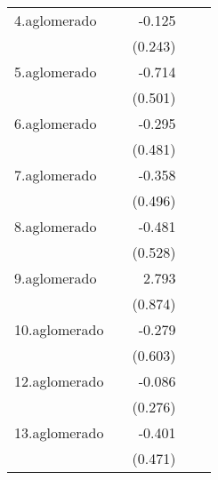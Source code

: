 {\begin{longtable}{l*{4}{D{.}{.}{-1}}}
\addlinespace
4.aglomerado&                     &      -0.125         &                     &                     \\
            &                     &     (0.243)         &                     &                     \\
\addlinespace
5.aglomerado&                     &      -0.714         &                     &                     \\
            &                     &     (0.501)         &                     &                     \\
\addlinespace
6.aglomerado&                     &      -0.295         &                     &                     \\
            &                     &     (0.481)         &                     &                     \\
\addlinespace
7.aglomerado&                     &      -0.358         &                     &                     \\
            &                     &     (0.496)         &                     &                     \\
\addlinespace
8.aglomerado&                     &      -0.481         &                     &                     \\
            &                     &     (0.528)         &                     &                     \\
\addlinespace
9.aglomerado&                     &       2.793\sym{**} &                     &                     \\
            &                     &     (0.874)         &                     &                     \\
\addlinespace
10.aglomerado&                     &      -0.279         &                     &                     \\
            &                     &     (0.603)         &                     &                     \\
\addlinespace
12.aglomerado&                     &      -0.086         &                     &                     \\
            &                     &     (0.276)         &                     &                     \\
\addlinespace
13.aglomerado&                     &      -0.401         &                     &                     \\
            &                     &     (0.471)         &                     &                     \\

\end{longtable}}
